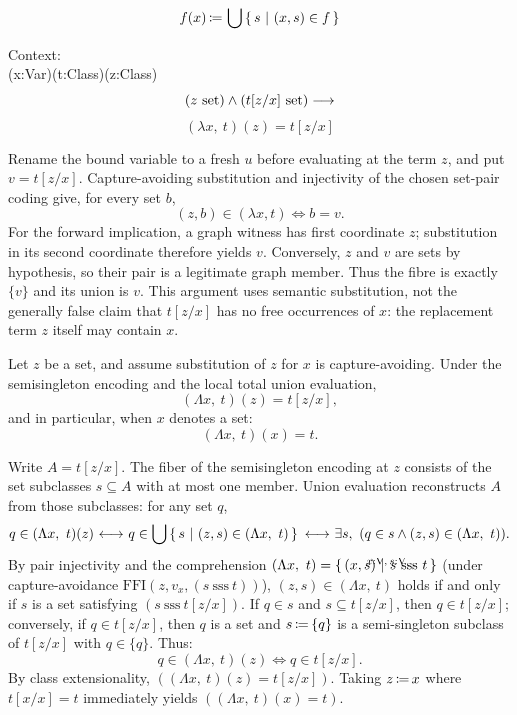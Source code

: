 \begin{definition*}
\[
f(x) \,{\coloneqq}\, \bigcup \left\{\,s\ \middle|\ (x,s)\in f\,\right\}
\]
\end{definition*}

\begin{theorem}
Context:\\
(x:Var)(t:Class)(z:Class)
\[
(z\mathrm{\ set}) \land (t[z/x]\mathrm{\ set}) \longrightarrow
\]
\[
(\lambda x,\ t)(z) = t[z/x]
\]
\end{theorem}
\Proof
Rename the bound variable to a fresh $u$ before evaluating at the term
$z$, and put $v=t[z/x]$. Capture-avoiding substitution and injectivity
of the chosen set-pair coding give, for every set $b$,
\[
(z,b)\in(\lambda x,t)\iff b=v.
\]
For the forward implication, a graph witness has first coordinate $z$;
substitution in its second coordinate therefore yields $v$. Conversely,
$z$ and $v$ are sets by hypothesis, so their pair is a legitimate graph
member. Thus the fibre is exactly $\{v\}$ and its union is $v$.
This argument uses semantic substitution, not the generally false claim
that $t[z/x]$ has no free occurrences of $x$: the replacement term $z$
itself may contain $x$.
\Done


\begin{theorem}
Let $z$ be a set, and assume substitution of $z$ for $x$ is capture-avoiding. Under the semisingleton encoding and the local total union evaluation,
\[
(\Lambda x,\ t)(z) = t[z/x],
\]
and in particular, when $x$ denotes a set:
\[
(\Lambda x,\ t)(x) = t.
\]
\end{theorem}
\Proof
Write $A=t[z/x]$. The fiber of the semisingleton encoding at $z$
consists of the set subclasses $s\subseteq A$ with at most one member.
Union evaluation reconstructs $A$ from those subclasses: for any set $q$,
\[
q \in (\Lambda x,\ t)(z)
{\ \longleftrightarrow\ } q \in \bigcup\left\{\,s\ \middle|\ (z, s) \in (\Lambda x,\ t)\,\right\}
{\ \longleftrightarrow\ } \exists s,\ (q \in s \land (z, s) \in (\Lambda x,\ t)).
\]
By pair injectivity and the comprehension $(\Lambda x,\ t) = \ccc{x:\V,\,s:\V}{(x,s)}{s\ \mbox{sss}\ t}$ (under capture-avoidance $\mathrm{FFI}(z, v_x, (s\ \mbox{sss}\ t))$), $(z, s) \in (\Lambda x,\ t)$ holds if and only if $s$ is a set satisfying $(s\ \mbox{sss}\ t[z/x])$. If $q \in s$ and $s \subseteq t[z/x]$, then $q \in t[z/x]$; conversely, if $q \in t[z/x]$, then $q$ is a set and $s \,{\coloneqq}\, \{q\}$ is a semi-singleton subclass of $t[z/x]$ with $q \in \{q\}$. Thus:
\[
q \in (\Lambda x,\ t)(z) \iff q \in t[z/x].
\]
By class extensionality, $((\Lambda x,\ t)(z) = t[z/x])$. Taking $z \,{\coloneqq}\, x$ where $t[x/x] = t$ immediately yields $((\Lambda x,\ t)(x) = t)$.
\Done

